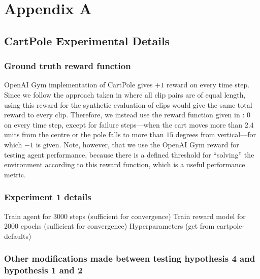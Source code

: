 \documentclass[11pt, a4paper, bibliography=totoc]{report}
\begin{document}
\appendix
\appendixpage
\noappendicestocpagenum
\addappheadtotoc
\chapter{Appendix A} \label{appendix:a}
\section{CartPole Experimental Details}
\subsection{Ground truth reward function}
OpenAI Gym implementation of CartPole gives $ +1 $ reward on every time step. Since we follow the approach taken in \cite{Christiano2017} where all clip pairs are of equal length, using this reward for the synthetic evaluation of clips would give the same total reward to every clip. Therefore, we instead use the reward function given in  \cite[p.~59]{Sutton2018}: $ 0 $ on every time step, except for failure steps---when the cart moves more than $ 2.4 $ units from the centre or the pole falls to more than $ 15 $ degrees from vertical---for which $ -1 $ is given. Note, however, that we use the OpenAI Gym reward for testing agent performance, because there is a defined threshold for ``solving'' the environment according to this reward function, which is a useful performance metric.
\subsection{Experiment 1 details} %
Train agent for 3000 steps (sufficient for convergence)
Train reward model for 2000 epochs (sufficient for convergence)
Hyperparameters (get from cartpole-defaults)

\subsection{Other modifications made between testing hypothesis 4 and hypothesis 1 and 2} \label{sec:other_changes}
\end{document}
